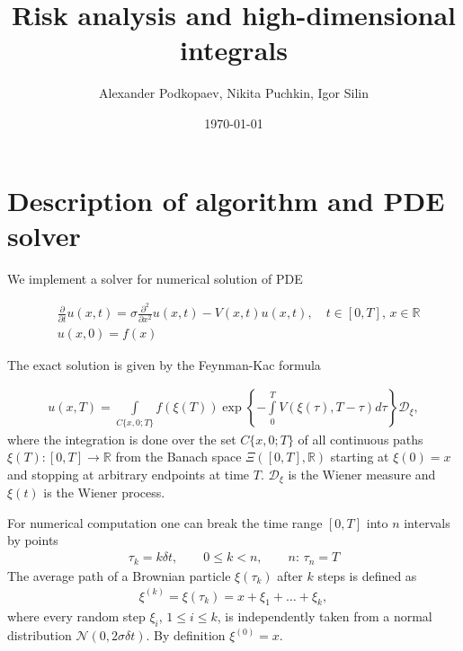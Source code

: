 \documentclass[11pt,a4paper]{extarticle}
\begin{document}
\title{Risk analysis and high-dimensional integrals}
\author{{\LARGE Alexander Podkopaev, Nikita Puchkin, Igor Silin}}
\date{\today}
\maketitle

\section{Description of algorithm and PDE solver}

We implement a solver for numerical solution of PDE

\begin{equation}
     \begin{aligned}
     \nonumber
        & \frac\partial{\partial t} u(x, t) = \sigma \frac{\partial^2}{\partial x^2} u(x, t) - V(x, t) u(x, t), \quad t\in [0, T], \, x\in \mathbb R \\
        & u(x, 0) = f(x)
     \end{aligned}
\end{equation}

The exact solution is given by the Feynman-Kac formula

\begin{equation}
    \begin{aligned}
    \nonumber
        u(x, T) = \int\limits_{C\{x, 0; T\}} f(\xi(T)) \exp\left\{ -\int\limits_0^T V(\xi(\tau), T-\tau) d\tau \right\} \mathcal D_\xi,
    \end{aligned}
\end{equation}
where the integration is done over the set $C\{x, 0; T\}$ of all continuous paths $\xi(T) : [0, T] \rightarrow \mathbb R$ from the Banach space $\Xi([0, T], \mathbb R)$ starting at $\xi(0) = x$ and stopping at arbitrary endpoints at time $T$.
$\mathcal D_\xi$ is the Wiener measure and $\xi(t)$ is the Wiener process.

For numerical computation one can break the time range $[0, T]$ into $n$ intervals by points
\begin{equation}
    \begin{aligned}
    \nonumber
        \tau_k = k \delta t, \qquad 0 \leq k < n, \qquad n: \, \tau_n = T
    \end{aligned}
\end{equation}
The average path of a Brownian particle $\xi(\tau_k)$ after $k$ steps is defined as
\begin{equation}
    \begin{aligned}
    \nonumber
        \xi^{(k)} = \xi(\tau_k) = x + \xi_1 + \dots + \xi_k,
    \end{aligned}
\end{equation}
where every random step $\xi_i$, $1 \leq i \leq k$, is independently taken from a normal distribution $\mathcal N(0, 2\sigma\delta t)$.
By definition $\xi^{(0)} = x$.
\end{document}
